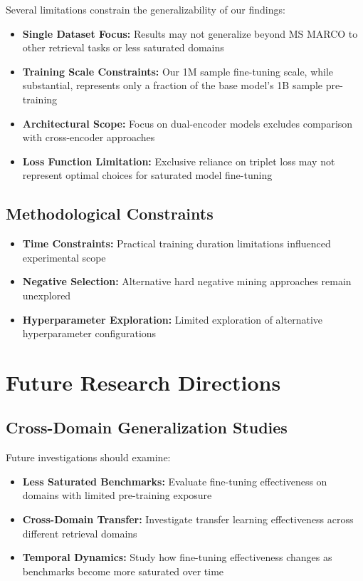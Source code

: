 Several limitations constrain the generalizability of our findings:

\begin{itemize}
\item \textbf{Single Dataset Focus:} Results may not generalize beyond MS MARCO to other retrieval tasks or less saturated domains
\item \textbf{Training Scale Constraints:} Our 1M sample fine-tuning scale, while substantial, represents only a fraction of the base model's 1B sample pre-training
\item \textbf{Architectural Scope:} Focus on dual-encoder models excludes comparison with cross-encoder approaches
\item \textbf{Loss Function Limitation:} Exclusive reliance on triplet loss may not represent optimal choices for saturated model fine-tuning
\end{itemize}

\subsection{Methodological Constraints}

\begin{itemize}
\item \textbf{Time Constraints:} Practical training duration limitations influenced experimental scope
\item \textbf{Negative Selection:} Alternative hard negative mining approaches remain unexplored
\item \textbf{Hyperparameter Exploration:} Limited exploration of alternative hyperparameter configurations
\end{itemize}

\section{Future Research Directions}

\subsection{Cross-Domain Generalization Studies}

Future investigations should examine:

\begin{itemize}
\item \textbf{Less Saturated Benchmarks:} Evaluate fine-tuning effectiveness on domains with limited pre-training exposure
\item \textbf{Cross-Domain Transfer:} Investigate transfer learning effectiveness across different retrieval domains
\item \textbf{Temporal Dynamics:} Study how fine-tuning effectiveness changes as benchmarks become more saturated over time
\end{itemize}

